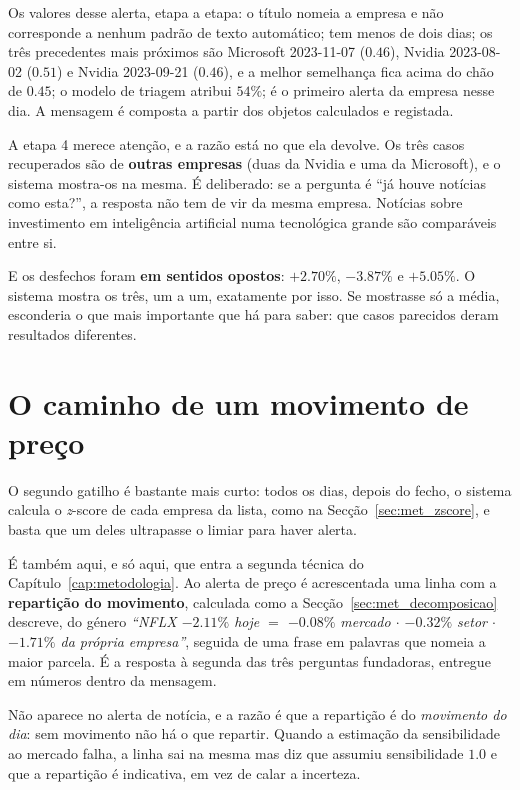 Os valores desse alerta, etapa a etapa: o título nomeia a empresa e não corresponde a nenhum padrão
de texto automático; tem menos de dois dias; os três precedentes mais próximos são Microsoft
2023-11-07 ($0.46$), Nvidia 2023-08-02 ($0.51$) e Nvidia 2023-09-21 ($0.46$), e a melhor semelhança
fica acima do chão de $0.45$; o modelo de triagem atribui $54\%$; é o primeiro alerta da empresa
nesse dia. A mensagem é composta a partir dos objetos calculados e registada.

A etapa 4 merece atenção, e a razão está no que ela devolve. Os três
casos recuperados são de \textbf{outras empresas} (duas da Nvidia e uma da Microsoft), e o
sistema mostra-os na mesma. É deliberado: se a pergunta é ``já houve notícias como esta?'', a
resposta não tem de vir da mesma empresa. Notícias sobre investimento em inteligência artificial numa
tecnológica grande são comparáveis entre si.

E os desfechos foram \textbf{em sentidos opostos}: $+2.70\%$, $-3.87\%$ e $+5.05\%$. O sistema
mostra os três, um a um, exatamente por isso. Se mostrasse só a média, esconderia o que mais
importante que há para saber: que casos parecidos deram resultados diferentes.

\section{O caminho de um movimento de preço}
\label{sec:sis_mercado}

O segundo gatilho é bastante mais curto: todos os dias, depois do fecho, o sistema calcula o
\emph{z}-score de cada empresa da lista, como na Secção~\ref{sec:met_zscore}, e basta que um deles
ultrapasse o limiar para haver alerta.

É também aqui, e só aqui, que entra a segunda técnica do Capítulo~\ref{cap:metodologia}. Ao alerta
de preço é acrescentada uma linha com a \textbf{repartição do movimento}, calculada como a
Secção~\ref{sec:met_decomposicao} descreve, do género
\emph{``NFLX $-2.11\%$ hoje $=$ $-0.08\%$ mercado $\cdot$ $-0.32\%$ setor $\cdot$ $-1.71\%$ da
própria empresa''}, seguida de uma frase em palavras que nomeia a maior parcela. É a resposta à
segunda das três perguntas fundadoras, entregue em números dentro da mensagem.

Não aparece no alerta de notícia, e a razão é que a repartição é do \emph{movimento do dia}: sem
movimento não há o que repartir. Quando a estimação da sensibilidade ao mercado falha, a linha sai
na mesma mas diz que assumiu sensibilidade $1.0$ e que a repartição é indicativa, em vez de calar
a incerteza.

